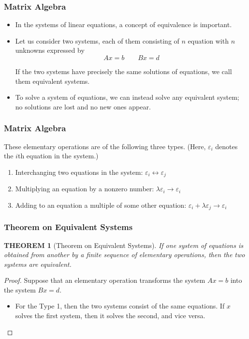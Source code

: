 \documentclass[notheorems,mathserif,table,compress]{beamer}  %
\begin{document}
\begin{frame}
\frametitle{Matrix Algebra}
\begin{itemize}
\item In the systems of linear equations, a concept of equivalence is important.
\item Let us consider two systems, each of them consisting of $n$ equation with $n$ unknowns expressed by
\begin{displaymath}
Ax=b \qquad Bx=d
\end{displaymath}

If the two systems have precisely the same solutions of equations, we call them \textsf{equivalent systems}.
\item To solve a system of equations, we can instead solve any equivalent system; no solutions are lost and no new ones appear.
\end{itemize}
\end{frame}

\begin{frame}
\frametitle{Matrix Algebra} 
These \textsf{elementary operations} are of the following three types. (Here, $\varepsilon_i$ denotes the $i$th equation in the system.)
\begin{enumerate}
\item Interchanging two equations in the system: $\varepsilon_i\leftrightarrow\varepsilon_j$
\item Multiplying an equation by a nonzero number: $\lambda\varepsilon_i\rightarrow\varepsilon_i$
\item Adding to an equation a multiple of some other equation: $\varepsilon_i+\lambda\varepsilon_j\rightarrow\varepsilon_i$
\end{enumerate}

\end{frame}

\begin{frame}
\frametitle{Theorem on Equivalent Systems}
\theoremstyle{plain}
\newtheorem{theorem}{THEOREM}
\begin{theorem}[Theorem on Equivalent Systems]
If one system of equations is obtained from another by a finite sequence of elementary operations, then the two systems are equivalent.
\end{theorem}
\begin{proof}
Suppose that an elementary operation transforms the system $Ax=b$ into the system $Bx=d$.
\begin{itemize}
\item For the Type 1, then the two systems consist of the same equations. If $x$ solves the first system, then it solves the second, and vice versa.
\end{itemize}

\end{proof}
\end{frame}
\end{document}
